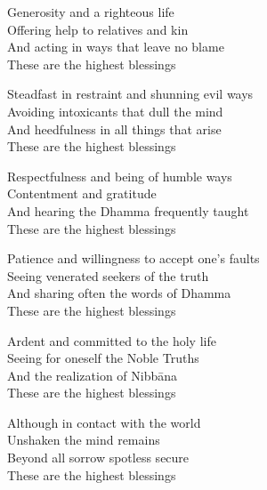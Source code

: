 \begin{english-only}
  Generosity and a righteous life\\
  Offering help to relatives and kin\\
  And acting in ways that leave no blame\\
  These are the highest blessings
\end{english-only}

\begin{english-only}
  Steadfast in restraint and shunning evil ways\\
  Avoiding intoxicants that dull the mind\\
  And heedfulness in all things that arise\\
  These are the highest blessings
\end{english-only}

\begin{english-only}
  Respectfulness and being of humble ways\\
  Contentment and gratitude\\
  And hearing the Dhamma frequently taught\\
  These are the highest blessings
\end{english-only}

\begin{english-only}
  Patience and willingness to accept one's faults\\
  Seeing venerated seekers of the truth\\
  And sharing often the words of Dhamma\\
  These are the highest blessings
\end{english-only}

\begin{english-only}
  Ardent and committed\hyperlink{endnote48-appendix}{\hypertarget{endnote48-body}{}}
  to the holy life\\
  Seeing for oneself the Noble Truths\\
  And the realization of Nibbāna\\
  These are the highest blessings
\end{english-only}

\begin{english-only}
  Although in contact with the world\\
  Unshaken the mind remains\\
  Beyond all sorrow spotless secure\\
  These are the highest blessings
\end{english-only}

